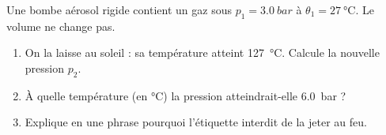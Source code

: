 \documentclass[11pt,a4paper]{article}
\begin{document}
\begin{exo}
Une bombe aérosol rigide contient un gaz sous $p_1=\qty{3.0}{bar}$ à $\theta_1=\qty{27}{\degreeCelsius}$.
Le volume ne change pas.
\begin{enumerate}[label=\alph*)]
  \item On la laisse au soleil : sa température atteint \qty{127}{\degreeCelsius}. Calcule la nouvelle
        pression $p_2$.
  \item À quelle température (en \si{\degreeCelsius}) la pression atteindrait-elle \qty{6.0}{bar} ?
  \item Explique en une phrase pourquoi l'étiquette interdit de la jeter au feu.
\end{enumerate}
\end{exo}
\end{document}
